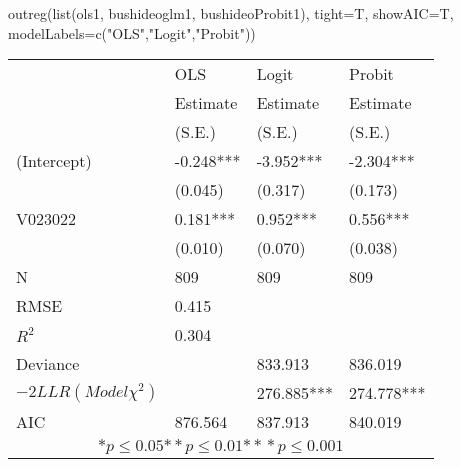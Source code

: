\begin{Schunk}
\begin{Sinput}
 outreg(list(ols1, bushideoglm1, bushideoProbit1), tight=T, showAIC=T, modelLabels=c("OLS","Logit","Probit"))
\end{Sinput}
\begin{tabular}{*{4}{l}}
\hline
     &  OLS&  Logit&  Probit\tabularnewline
   & Estimate & Estimate & Estimate \tabularnewline
    & (S.E.) & (S.E.) & (S.E.)\tabularnewline
 \hline
 \hline
  (Intercept)    &-0.248*** &-3.952*** &-2.304*** \tabularnewline
     &  (0.045) &  (0.317) &  (0.173)\tabularnewline
  V023022    &0.181*** &0.952*** &0.556*** \tabularnewline
     &  (0.010) &  (0.070) &  (0.038)\tabularnewline
 \hline
 N & 809 & 809 & 809 \tabularnewline
 RMSE             &0.415   &       &       \tabularnewline
 $R^2$             &0.304   &       &       \tabularnewline
 Deviance         &       &833.913   &836.019   \tabularnewline
 $-2LLR (Model \chi^2)$  &  &   276.885*** &   274.778*** \tabularnewline
 AIC & 876.564 & 837.913 & 840.019\tabularnewline
 \hline
\hline
 
 \multicolumn{4}{c}{${*  p}\le 0.05$${*\!\!*  p}\le 0.01$${*\!\!*\!\!*  p}\le 0.001$}\tabularnewline
 \end{tabular}\end{Schunk}
